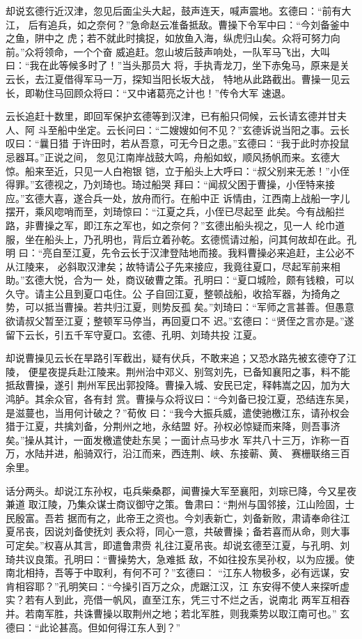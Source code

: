 却说玄德行近汉津，忽见后面尘头大起，鼓声连天，喊声震地。玄德曰：“前有大江，
后有追兵，如之奈何？”急命赵云准备抵敌。曹操下令军中曰：“今刘备釜中之鱼，阱中之
虎；若不就此时擒捉，如放鱼入海，纵虎归山矣。众将可努力向前。”众将领命，一个个奋
威追赶。忽山坡后鼓声响处，一队军马飞出，大叫曰：“我在此等候多时了！”当头那员大
将，手执青龙刀，坐下赤兔马，原来是关云长，去江夏借得军马一万，探知当阳长坂大战，
特地从此路截出。曹操一见云长，即勒住马回顾众将曰：“又中诸葛亮之计也！”传令大军
速退。

云长追赶十数里，即回军保护玄德等到汉津，已有船只伺候，云长请玄德并甘夫人、阿
斗至船中坐定。云长问曰：“二嫂嫂如何不见？”玄德诉说当阳之事。云长叹曰：“曩日猎
于许田时，若从吾意，可无今日之患。”玄德曰：“我于此时亦投鼠忌器耳。”正说之间，
忽见江南岸战鼓大鸣，舟船如蚁，顺风扬帆而来。玄德大惊。船来至近，只见一人白袍银
铠，立于船头上大呼曰：“叔父别来无恙！”小侄得罪。”玄德视之，乃刘琦也。琦过船哭
拜曰：“闻叔父困于曹操，小侄特来接应。”玄德大喜，遂合兵一处，放舟而行。在船中正
诉情由，江西南上战船一字儿摆开，乘风唿哨而至，刘琦惊曰：“江夏之兵，小侄已尽起至
此矣。今有战船拦路，非曹操之军，即江东之军也，如之奈何？”玄德出船头视之，见一人
纶巾道服，坐在船头上，乃孔明也，背后立着孙乾。玄德慌请过船，问其何故却在此。孔明
曰：“亮自至江夏，先令云长于汉津登陆地而接。我料曹操必来追赶，主公必不从江陵来，
必斜取汉津矣；故特请公子先来接应，我竟往夏口，尽起军前来相助。”玄德大悦，合为一
处，商议破曹之策。孔明曰：“夏口城险，颇有钱粮，可以久守。请主公且到夏口屯住。公
子自回江夏，整顿战船，收拾军器，为掎角之势，可以抵当曹操。若共归江夏，则势反孤
矣。”刘琦曰：“军师之言甚善。但愚意欲请叔父暂至江夏；整顿军马停当，再回夏口不
迟。”玄德曰：“贤侄之言亦是。”遂留下云长，引五千军守夏口。玄德、孔明、刘琦共投
江夏。

却说曹操见云长在旱路引军截出，疑有伏兵，不敢来追；又恐水路先被玄德夺了江陵，
便星夜提兵赴江陵来。荆州治中邓义、别驾刘先，已备知襄阳之事，料不能抵敌曹操，遂引
荆州军民出郭投降。曹操入城、安民已定，释韩嵩之囚，加为大鸿胪。其余众官，各有封
赏。曹操与众将议曰：“今刘备已投江夏，恐结连东吴，是滋蔓也，当用何计破之？”荀攸
曰：“我今大振兵威，遣使驰檄江东，请孙权会猎于江夏，共擒刘备，分荆州之地，永结盟
好。孙权必惊疑而来降，则吾事济矣。”操从其计，一面发檄遣使赴东吴；一面计点马步水
军共八十三万，诈称一百万，水陆并进，船骑双行，沿江而来，西连荆、峡、东接蕲、黄、
赛栅联络三百余里。

话分两头。却说江东孙权，屯兵柴桑郡，闻曹操大军至襄阳，刘琮已降，今又星夜兼道
取江陵，乃集众谋士商议御守之策。鲁肃曰：“荆州与国邻接，江山险固，士民殷富。吾若
据而有之，此帝王之资也。今刘表新亡，刘备新败，肃请奉命往江夏吊丧，因说刘备使抚刘
表众将，同心一意，共破曹操；备若喜而从命，则大事可定矣。”权喜从其言，即遣鲁肃赍
礼往江夏吊丧。却说玄德至江夏，与孔明、刘琦共议良策。孔明曰：“曹操势大，急难抵
敌，不如往投东吴孙权，以为应援。使南北相持，吾等于中取利，有何不可？”玄德曰：
“江东人物极多，必有远谋，安肯相容耶？”孔明笑曰：“今操引百万之众，虎踞江汉，江
东安得不使人来探听虚实？若有人到此，亮借一帆风，直至江东，凭三寸不烂之舌，说南北
两军互相吞并。若南军胜，共诛曹操以取荆州之地；若北军胜，则我乘势以取江南可也。”
玄德曰：“此论甚高。但如何得江东人到？”

